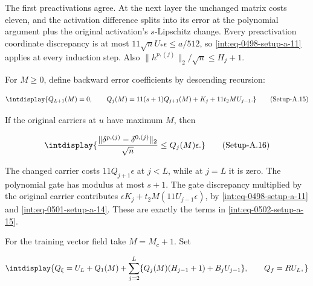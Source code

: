 The first preactivations agree. At the next layer the unchanged matrix costs eleven, and the activation difference splits into its error at the polynomial argument plus the original activation's \(s\)-Lipschitz change. Every preactivation coordinate discrepancy is at most \(11\sqrt nU_*\epsilon\le a/512\), so \hyperref[int:eq-setup-a-11]{\eqref{int:eq-0498-setup-a-11}} applies at every induction step. Also \(\|h^{p,\allowbreak (j)}\|_2/\sqrt n\le H_j+1\).



For \(M\ge0\), define backward error coefficients by descending recursion:


\label{int:eq-setup-a-15}
\begingroup\renewcommand{\theHequation}{intdisplay.978}
\begin{equation}
\intdisplay{
Q_{L+1}(M)=0,\qquad
Q_j(M)=11(s+1)Q_{j+1}(M)+K_j+11t_2M U_{j-1}.
}
\tag{Setup-A.15}
\label{int:eq-0502-setup-a-15}
\end{equation}
\endgroup


If the original carriers at \(u\) have maximum \(M\), then


\label{int:eq-setup-a-16}
\begingroup\renewcommand{\theHequation}{intdisplay.979}
\begin{equation}
\intdisplay{
\frac{\|\delta^{p,(j)}-\delta^{0,(j)}\|_2}{\sqrt n}
\le Q_j(M)\epsilon.
}
\tag{Setup-A.16}
\label{int:eq-0503-setup-a-16}
\end{equation}
\endgroup


The changed carrier costs \(11Q_{j+1}\epsilon\) at \(j<L\), while at \(j=L\) it is zero. The polynomial gate has modulus at most \(s+1\). The gate discrepancy multiplied by the original carrier contributes \(\epsilon K_j+t_2M(11U_{j-1}\epsilon)\), by \hyperref[int:eq-setup-a-11]{\eqref{int:eq-0498-setup-a-11}} and \hyperref[int:eq-setup-a-14]{\eqref{int:eq-0501-setup-a-14}}. These are exactly the terms in \hyperref[int:eq-setup-a-15]{\eqref{int:eq-0502-setup-a-15}}.



For the training vector field take \(M=M_c+1\). Set


\begingroup\renewcommand{\theHequation}{intdisplay.980}
\begin{equation*}
\intdisplay{
Q_\xi=U_L+Q_1(M)+
\sum_{j=2}^L\{Q_j(M)(H_{j-1}+1)+B_jU_{j-1}\},
\qquad Q_f=RU_L,
}
\end{equation*}
\endgroup


